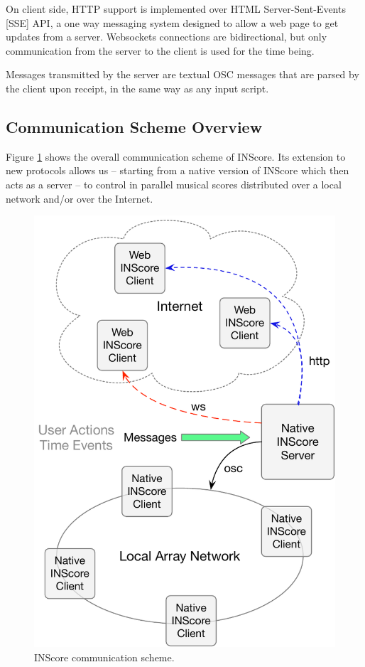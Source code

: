 \documentclass{article}
\begin{document}
On client side, HTTP support is implemented over HTML Server-Sent-Events [SSE] API, a one way messaging system designed to allow a web page to get updates from a server. Websockets connections are bidirectional, but only communication from the server to the client is used for the time being.

Messages transmitted by the server are textual OSC messages that are parsed by the client upon receipt, in the same way as any input script.  

\subsection{Communication Scheme Overview}\label{sec:comm}

Figure \ref{fig:comm} shows the overall communication scheme of INScore. Its extension to new protocols allows us -- starting from a native version of INScore which then acts as a server -- to control in parallel musical scores distributed over a local network and/or over the Internet.

\begin{figure}[h]
\centering
\includegraphics[width=0.90\columnwidth]{rsrc/communication.pdf}
\caption{INScore communication scheme.}
\label{fig:comm}
\end{figure}
\end{document}
